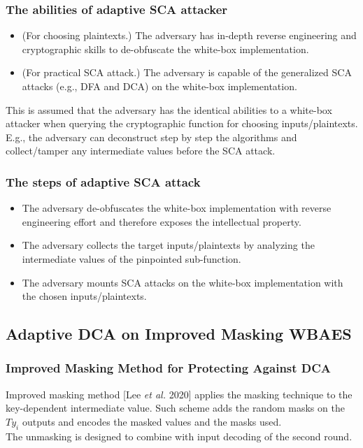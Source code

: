 \documentclass{beamer}
\begin{document}
\frame
{
	\frametitle{The abilities of adaptive SCA attacker}
	\begin{itemize}
		\item (For choosing plaintexts.) The adversary has in-depth reverse engineering and cryptographic skills to de-obfuscate the white-box implementation.
		\item (For practical SCA attack.) The adversary is capable of the generalized SCA attacks (e.g., DFA and DCA) on the white-box implementation.
	\end{itemize}
	This is assumed that the adversary has the identical abilities to a white-box attacker when querying the cryptographic function for choosing inputs/plaintexts. E.g., the adversary can deconstruct step by step the algorithms and collect/tamper any intermediate values before the SCA attack.
}

\frame
{
	\frametitle{The steps of adaptive SCA attack}
	\begin{itemize}
		\item The adversary de-obfuscates the white-box implementation with reverse engineering effort and therefore exposes the intellectual property.
		\item The adversary collects the target inputs/plaintexts by analyzing the intermediate values of the pinpointed sub-function.
		\item The adversary mounts SCA attacks on the white-box implementation with the chosen inputs/plaintexts.
	\end{itemize}
}


\subsection{Adaptive DCA on Improved Masking WBAES}

\frame
{
	\frametitle{Improved Masking Method for Protecting Against DCA}
	Improved masking method [Lee \textit{et al.} 2020] applies the masking technique to the key-dependent intermediate value. Such scheme adds the random masks on the $Ty_i$ outputs and encodes the masked values and the masks used.
	\\[2ex]
	The unmasking is designed to combine with input decoding of the second round.
}
\end{document}
